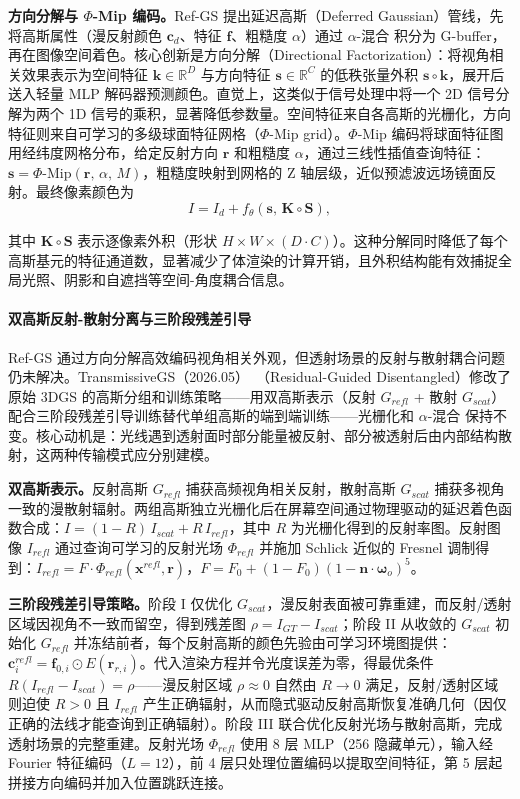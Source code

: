 \textbf{方向分解与 $\Phi$-Mip 编码。}Ref-GS 提出延迟高斯（Deferred Gaussian）管线，先将高斯属性（漫反射颜色 $\mathbf{c}_d$、特征 $\mathbf{f}$、粗糙度 $\alpha$）通过 $\alpha$-混合 积分为 G-buffer，再在图像空间着色。核心创新是方向分解（Directional Factorization）：将视角相关效果表示为空间特征 $\mathbf{k}\in\mathbb{R}^D$ 与方向特征 $\mathbf{s}\in\mathbb{R}^C$ 的低秩张量外积 $\mathbf{s}\circ\mathbf{k}$，展开后送入轻量 MLP 解码器预测颜色。直觉上，这类似于信号处理中将一个 2D 信号分解为两个 1D 信号的乘积，显著降低参数量。空间特征来自各高斯的光栅化，方向特征则来自可学习的多级球面特征网格（$\Phi$-Mip grid）。$\Phi$-Mip 编码将球面特征图用经纬度网格分布，给定反射方向 $\mathbf{r}$ 和粗糙度 $\alpha$，通过三线性插值查询特征：$\mathbf{s}=\Phi\text{-Mip}(\mathbf{r},\,\alpha,\,M)$，粗糙度映射到网格的 Z 轴层级，近似预滤波远场镜面反射。最终像素颜色为
\begin{equation}
I = I_d + f_\theta(\mathbf{s},\,\mathbf{K}\circ\mathbf{S}),
\end{equation}

其中 $\mathbf{K}\circ\mathbf{S}$ 表示逐像素外积（形状 $H\!\times\!W\!\times\!(D\cdot C)$）。这种分解同时降低了每个高斯基元的特征通道数，显著减少了体渲染的计算开销，且外积结构能有效捕捉全局光照、阴影和自遮挡等空间-角度耦合信息。

\paragraph{双高斯反射-散射分离与三阶段残差引导}

Ref-GS 通过方向分解高效编码视角相关外观，但透射场景的反射与散射耦合问题仍未解决。TransmissiveGS（2026.05）~\cite{2605_10705}（Residual-Guided Disentangled）修改了原始 3DGS 的高斯分组和训练策略——用双高斯表示（反射 $G_{refl}$ + 散射 $G_{scat}$）配合三阶段残差引导训练替代单组高斯的端到端训练——光栅化和 $\alpha$-混合 保持不变。核心动机是：光线遇到透射面时部分能量被反射、部分被透射后由内部结构散射，这两种传输模式应分别建模。

\textbf{双高斯表示。}反射高斯 $G_{refl}$ 捕获高频视角相关反射，散射高斯 $G_{scat}$ 捕获多视角一致的漫散射辐射。两组高斯独立光栅化后在屏幕空间通过物理驱动的延迟着色函数合成：$I=(1-R)\,I_{scat}+R\,I_{refl}$，其中 $R$ 为光栅化得到的反射率图。反射图像 $I_{refl}$ 通过查询可学习的反射光场 $\Phi_{refl}$ 并施加 Schlick 近似的 Fresnel 调制得到：$I_{refl}=F\cdot\Phi_{refl}(\mathbf{x}^{refl},\mathbf{r})$，$F=F_0+(1-F_0)(1-\mathbf{n}\cdot\boldsymbol{\omega}_o)^5$。

\textbf{三阶段残差引导策略。}阶段 I 仅优化 $G_{scat}$，漫反射表面被可靠重建，而反射/透射区域因视角不一致而留空，得到残差图 $\rho=I_{GT}-I_{scat}$；阶段 II 从收敛的 $G_{scat}$ 初始化 $G_{refl}$ 并冻结前者，每个反射高斯的颜色先验由可学习环境图提供：$\mathbf{c}_i^{refl}=\mathbf{f}_{0,i}\odot E(\mathbf{r}_{r,i})$。代入渲染方程并令光度误差为零，得最优条件 $R(I_{refl}-I_{scat})=\rho$——漫反射区域 $\rho\approx0$ 自然由 $R\to0$ 满足，反射/透射区域则迫使 $R>0$ 且 $I_{refl}$ 产生正确辐射，从而隐式驱动反射高斯恢复准确几何（因仅正确的法线才能查询到正确辐射）。阶段 III 联合优化反射光场与散射高斯，完成透射场景的完整重建。反射光场 $\Phi_{refl}$ 使用 8 层 MLP（256 隐藏单元），输入经 Fourier 特征编码（$L=12$），前 4 层只处理位置编码以提取空间特征，第 5 层起拼接方向编码并加入位置跳跃连接。

